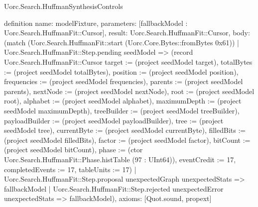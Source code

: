 \begin{lexlean}{Uorc.Search.HuffmanSynthesisControls}
\begin{semanticmodule}
definition{
  name: modelFixture,
  parameters: [fallbackModel : Uorc.Search.HuffmanFit::Cursor],
  result: Uorc.Search.HuffmanFit::Cursor,
  body: (match (Uorc.Search.HuffmanFit::start (Uorc.Core.Bytes::fromBytes 0x61))
    | Uorc.Search.HuffmanFit::Step.pending seedModel => (record Uorc.Search.HuffmanFit::Cursor {target := (project seedModel target), totalBytes := (project seedModel totalBytes), position := (project seedModel position), frequencies := (project seedModel frequencies), parents := (project seedModel parents), nextNode := (project seedModel nextNode), root := (project seedModel root), alphabet := (project seedModel alphabet), maximumDepth := (project seedModel maximumDepth), treeBuilder := (project seedModel treeBuilder), payloadBuilder := (project seedModel payloadBuilder), tree := (project seedModel tree), currentByte := (project seedModel currentByte), filledBits := (project seedModel filledBits), factor := (project seedModel factor), bitCount := (project seedModel bitCount), phase := (ctor Uorc.Search.HuffmanFit::Phase.histTable (97 : UInt64)), eventCredit := 17, completedEvents := 17, tableUnits := 17})
    | Uorc.Search.HuffmanFit::Step.proposal unexpectedGraph unexpectedStats => fallbackModel
    | Uorc.Search.HuffmanFit::Step.rejected unexpectedError unexpectedStats => fallbackModel),
  axioms: [Quot.sound, propext]
}


\end{semanticmodule}
\end{lexlean}
